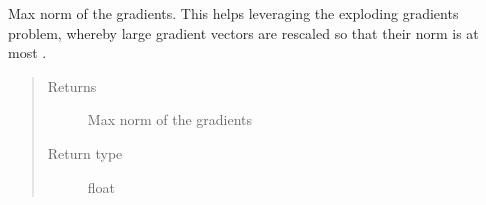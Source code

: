 \documentclass[letterpaper,10pt,english]{sphinxmanual}
\begin{document}
\begin{fulllineitems}
\begin{fulllineitems}
\begin{quote}
\begin{description}
\end{description}\end{quote}

\end{fulllineitems}


\begin{fulllineitems}
\label{\detokenize{code:gpt2_summarizer_train.TrainGPT2Summarizer.max_grad_norm}}
\sphinxAtStartPar
Max norm of the gradients. This helps leveraging the exploding gradients
problem, whereby large gradient vectors are rescaled so that their norm is at
most .
\begin{quote}\begin{description}
\item[{Returns}] \leavevmode
\sphinxAtStartPar
Max norm of the gradients

\item[{Return type}] \leavevmode
\sphinxAtStartPar
float

\end{description}\end{quote}

\end{fulllineitems}



\end{fulllineitems}
\end{document}
